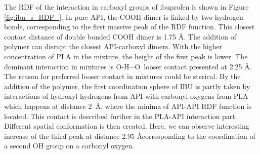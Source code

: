 The RDF of the interaction in carboxyl groups of ibuprofen is shown in Figure \ref{fig:ibu_s_RDF_}. In pure API, the COOH dimer is linked by two hydrogen bonds, corresponding to the first massive peak of the RDF function. This closest contact distance of double bonded COOH dimer is 1.75 \AA. The addition of polymer can disrupt the closest API-carboxyl dimers. With the higher concentration of PLA in the mixture, the height of the first peak is lower. The dominant interaction in mixtures is O-H$\cdots$O~looser contact presented at 2.25 \AA. The reason for preferred looser contact in mixtures could be sterical. By the addition of the polymer, the first coordination sphere of IBU is partly taken by interactions of hydroxyl hydrogens from API with carbonyl oxygens from PLA which happens at distance 2~\AA, where the minima of API-API RDF function is located. This contact is described further in the PLA-API interaction part. Different spatial conformation is then created. Here, we can observe interesting increase of the third peak at distance 2.95 \AA corresponding to the coordination of a second OH group on a carbonyl oxygen.

